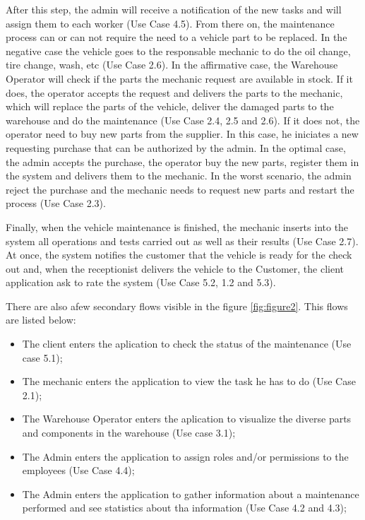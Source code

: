 After this step, the admin will receive a notification of the new tasks and will assign them to each worker (Use Case 4.5).
From there on, the maintenance process can or can not require the need to a vehicle part to be replaced. 
In the negative case the vehicle goes to the responsable mechanic to do the oil change, tire change, wash, etc (Use Case 2.6). 
In the affirmative case, the Warehouse Operator will check if the parts the mechanic request are available in stock. 
If it does, the operator accepts the request and delivers the parts to the mechanic, which will replace the parts of the vehicle, deliver the damaged parts to the warehouse and do the maintenance (Use Case 2.4, 2.5 and 2.6). 
If it does not, the operator need to buy new parts from the supplier. 
In this case, he iniciates a new requesting purchase that can be authorized by the admin. 
In the optimal case, the admin accepts the purchase, the operator buy the new parts, register them in the system and delivers them to the mechanic. 
In the worst scenario, the admin reject the purchase and the mechanic needs to request new parts and restart the process (Use Case 2.3).    

Finally, when the vehicle maintenance is finished, the mechanic inserts into the system all operations and tests carried out as well as their results (Use Case 2.7). 
At once, the system notifies the customer that the vehicle is ready for the check out and, when the receptionist delivers the vehicle to the Customer, the client application ask to rate the system (Use Case 5.2, 1.2 and 5.3).

There are also afew secondary flows visible in the figure \ref{fig:figure2}. 
This flows are listed below:
\begin{itemize}
  \item The client enters the aplication to check the status of the maintenance (Use case 5.1);
  \item The mechanic enters the application to view the task he has to do (Use Case 2.1); 
  \item The Warehouse Operator enters the aplication to visualize the diverse parts and components in the warehouse (Use case 3.1); 
  \item The Admin enters the application to assign roles and/or permissions to the employees (Use Case 4.4); 
  \item The Admin enters the application to gather information about a maintenance performed and see statistics about tha information (Use Case 4.2 and 4.3); 
\end{itemize}
 








